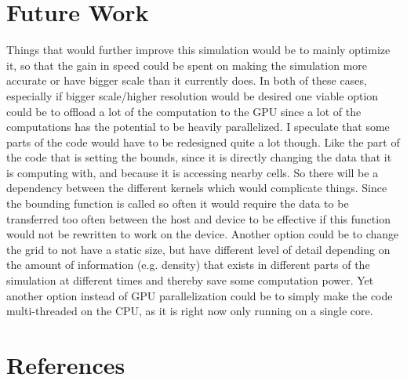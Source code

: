 \documentclass{article}
\begin{document}
\begin{multicols}{2}
\section{Future Work}
Things that would further improve this simulation would be to mainly optimize it, so that the gain in speed could be spent on making the simulation more accurate or have bigger scale than it currently does. In both of these cases, especially if bigger scale/higher resolution would be desired one viable option could be to offload a lot of the computation to the GPU since a lot of the computations has the potential to be heavily parallelized. I speculate that some parts of the code would have to be redesigned quite a lot though. Like the part of the code that is setting the bounds, since it is directly changing the data that it is computing with, and because it is accessing nearby cells. So there will be a dependency between the different kernels which would complicate things. Since the bounding function is called so often it would require the data to be transferred too often between the host and device to be effective if this function would not be rewritten to work on the device. Another option could be to change the grid to not have a static size, but have different level of detail depending on the amount of information (e.g. density) that exists in different parts of the simulation at different times and thereby save some computation power. Yet another option instead of GPU parallelization could be to simply make the code multi-threaded on the CPU, as it is right now only running on a single core.

\section*{References}

\end{multicols}
\end{document}
